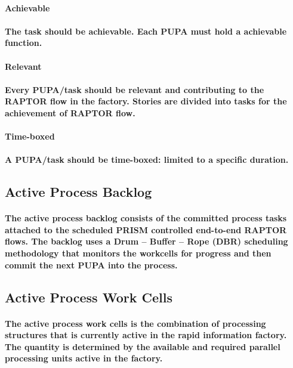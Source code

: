 \documentclass{acm_proc_article-sp}
\begin{document}
\paragraph{\textbf{Achievable}}
\paragraph{The task should be achievable. Each PUPA must hold a achievable function.}
\paragraph{\textbf{Relevant}}
\paragraph{Every PUPA/task should be relevant and contributing to the RAPTOR flow in the factory. Stories are divided into tasks for the achievement of RAPTOR flow.}
\paragraph{\textbf{Time-boxed}}
\paragraph{A PUPA/task should be time-boxed: limited to a specific duration.}
\subsection{\textbf{Active Process Backlog}}
\paragraph{The active process backlog consists of the committed process tasks attached to the scheduled PRISM controlled end-to-end RAPTOR flows. The backlog uses a Drum – Buffer – Rope (DBR) scheduling methodology \cite{daniel1997scheduling} that monitors the workcells for progress and then commit the next PUPA into the process.}
\subsection{\textbf{Active Process Work Cells}}
\paragraph{The active process work cells is the combination of processing structures that is currently active in the rapid information factory. The quantity is determined by the available and required parallel processing units active in the factory.}
\end{document}
